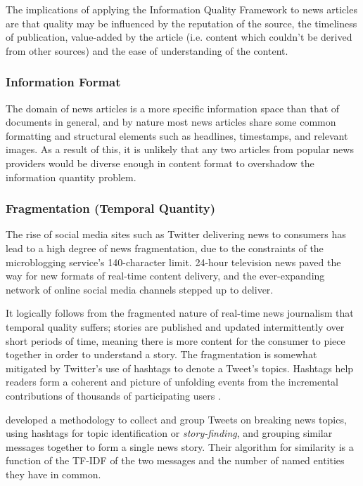 The implications of applying the Information Quality Framework \citep{DataQualityInContext} to news articles are that quality may be influenced by the reputation of the source, the timeliness of publication, value-added by the article (i.e. content which couldn't be derived from other sources) and the ease of understanding of the content.

\subsubsection{Information Format}
The domain of news articles is a more specific information space than that of documents in general, and by nature most news articles share some common formatting and structural elements such as headlines, timestamps, and relevant images. As a result of this, it is unlikely that any two articles from popular news providers would be diverse enough in content format to overshadow the information quantity problem.

\subsubsection{Fragmentation (Temporal Quantity)}

The rise of social media sites such as Twitter delivering news to consumers has lead to a high degree of news fragmentation, due to the constraints of the microblogging service's 140-character limit. 24-hour television news paved the way for new formats of real-time content delivery, and the ever-expanding network of online social media channels stepped up to deliver. 

It logically follows from the fragmented nature of real-time news journalism that temporal quality suffers; stories are published and updated intermittently over short periods of time, meaning there is more content for the consumer to piece together in order to understand a story. The fragmentation is somewhat mitigated by Twitter's use of hashtags to denote a Tweet's topics. Hashtags help readers form a coherent and picture of unfolding events from the incremental contributions of thousands of participating users \citep{BlogsTwitterAndBreakingNews}.

\citet{BreakingNewsDetectionAndTrackingInTwitter} developed a methodology to collect and group Tweets on breaking news topics, using hashtags for topic identification or \textit{story-finding}, and grouping similar messages together to form a single news story. Their algorithm for similarity is a function of the TF-IDF \citep{TermWeightingApproachesInAutomaticTextRetrieval} of the two messages and the number of named entities they have in common.

